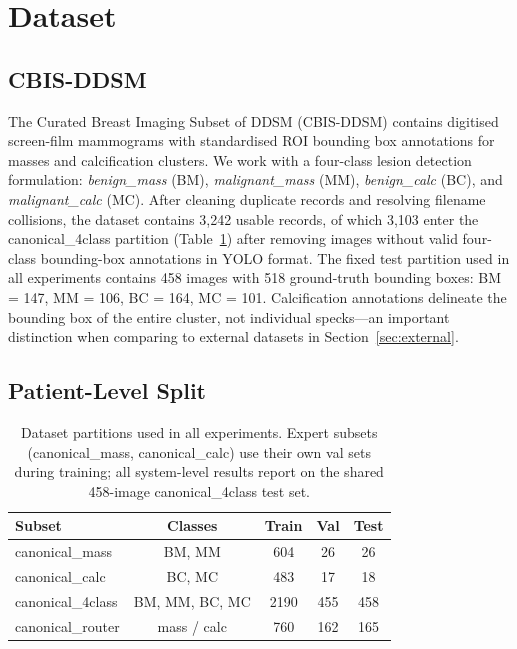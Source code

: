 \documentclass[runningheads]{llncs}
\begin{document}
\section{Dataset}
\label{sec:dataset}

\subsection{CBIS-DDSM}

The Curated Breast Imaging Subset of DDSM (CBIS-DDSM)
\cite{lee2017curated} contains digitised screen-film mammograms with
standardised ROI bounding box annotations for masses and calcification
clusters. We work with a four-class lesion detection formulation:
\textit{benign\_mass} (BM), \textit{malignant\_mass} (MM),
\textit{benign\_calc} (BC), and \textit{malignant\_calc} (MC). After
cleaning duplicate records and resolving filename collisions, the
dataset contains 3,242 usable records, of which 3,103 enter the
canonical\_4class partition (Table~\ref{tab:dataset}) after removing
images without valid four-class bounding-box annotations in YOLO
format. The fixed test partition used in all experiments contains 458
images with 518 ground-truth bounding boxes: BM = 147, MM = 106,
BC = 164, MC = 101. Calcification
annotations delineate the bounding box of the entire cluster, not
individual specks---an important distinction when comparing to external
datasets in Section~\ref{sec:external}.

\subsection{Patient-Level Split}

\begin{table}[tb]
\caption{Dataset partitions used in all experiments. Expert subsets
(canonical\_mass, canonical\_calc) use their own val sets during
training; all system-level results report on the shared 458-image
canonical\_4class test set.}
\label{tab:dataset}
\centering
\begin{tabular}{lcccc}
\toprule
\textbf{Subset} & \textbf{Classes} & \textbf{Train} & \textbf{Val} & \textbf{Test}\\
\midrule
canonical\_mass   & BM, MM         & 604  &  26 &  26\\
canonical\_calc   & BC, MC         & 483  &  17 &  18\\
canonical\_4class & BM, MM, BC, MC & 2190 & 455 & 458\\
canonical\_router & mass / calc    & 760  & 162 & 165\\
\bottomrule
\end{tabular}
\end{table}
\end{document}
